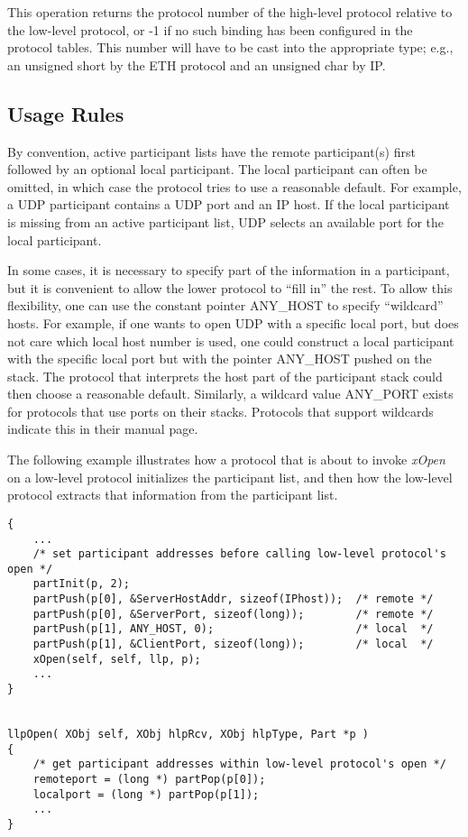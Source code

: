\noindent This operation returns the protocol number of the high-level
protocol relative to the low-level protocol, or -1 if no such binding
has been configured in the protocol tables.  This number will have to
be cast into the appropriate type; e.g., an unsigned short by the
ETH protocol and an unsigned char by IP.

\subsection{Usage Rules}
\label{part_usage}

By convention, active participant lists have the remote participant(s)
first followed by an optional local participant.  The local
participant can often be omitted, in which case the protocol tries to
use a reasonable default.  For example, a UDP participant contains a
UDP port and an IP host.  If the local participant is missing from an
active participant list, UDP selects an available port for the local
participant.

In some cases, it is necessary to specify part of the information in a
participant, but it is convenient to allow the lower protocol to
``fill in'' the rest.  To allow this flexibility, one can use the
constant pointer ANY\_HOST to specify ``wildcard'' hosts.  For
example, if one wants to open UDP with a specific local port, but does
not care which local host number is used, one could construct a local
participant with the specific local port but with the pointer
ANY\_HOST pushed on the stack.  The protocol that interprets the host
part of the participant stack could then choose a reasonable default.
Similarly, a wildcard value ANY\_PORT exists for protocols that use ports
on their stacks.  Protocols that support wildcards indicate this
in their manual page.

The following example illustrates how a protocol that is about to invoke
{\em xOpen} on a low-level protocol initializes the participant list, and 
then how the low-level protocol extracts that information from the
participant list.

\begin{verbatim}
{
    ...
    /* set participant addresses before calling low-level protocol's open */
    partInit(p, 2);
    partPush(p[0], &ServerHostAddr, sizeof(IPhost));  /* remote */
    partPush(p[0], &ServerPort, sizeof(long));        /* remote */
    partPush(p[1], ANY_HOST, 0);                      /* local  */
    partPush(p[1], &ClientPort, sizeof(long));        /* local  */
    xOpen(self, self, llp, p);
    ...
}


llpOpen( XObj self, XObj hlpRcv, XObj hlpType, Part *p )
{
    /* get participant addresses within low-level protocol's open */
    remoteport = (long *) partPop(p[0]);
    localport = (long *) partPop(p[1]);
    ...
}
\end{verbatim}

